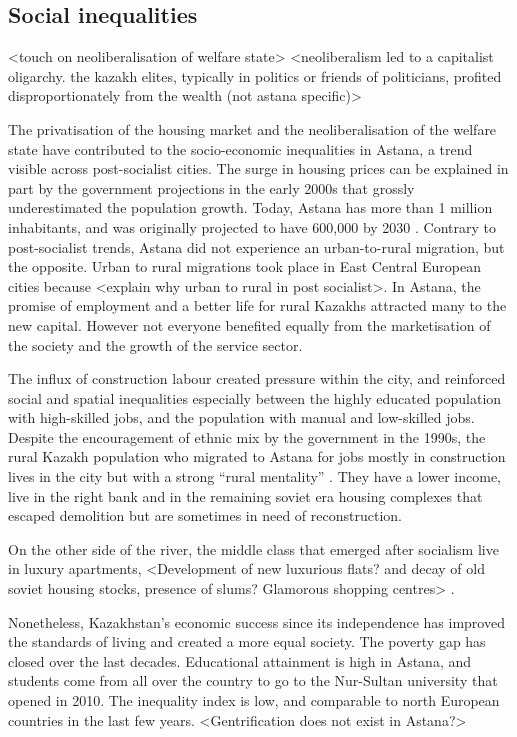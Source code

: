 \documentclass{article}
\begin{document}
\subsection{Social inequalities}

<touch on neoliberalisation of welfare state> 
<neoliberalism led to a capitalist oligarchy. the kazakh elites, typically in politics or friends of politicians, profited disproportionately from the wealth (not astana specific)>

The privatisation of the housing market and the neoliberalisation of the welfare state have contributed to the socio-economic inequalities in Astana, a trend visible across post-socialist cities. The surge in housing prices can be explained in part by the government projections in the early 2000s that grossly underestimated the population growth. Today, Astana has more than 1 million inhabitants, and was originally projected to have 600,000 by 2030 \parencite{masterplan2001}. Contrary to post-socialist trends, Astana did not experience an urban-to-rural migration, but the opposite. Urban to rural migrations took place in East Central European cities because <explain why urban to rural in post socialist>. In Astana, the promise of employment and a better life for rural Kazakhs attracted many to the new capital. However not everyone benefited equally from the marketisation of the society and the growth of the service sector.

The influx of construction labour created pressure within the city, and reinforced social and spatial inequalities especially between the highly educated population with high-skilled jobs, and the population with manual and low-skilled jobs.
Despite the encouragement of ethnic mix by the government in the 1990s, the rural Kazakh population who migrated to Astana for jobs mostly in construction lives in the city but with a strong ``rural mentality'' \parencite{koch2014bordering}. They have a lower income, live in the right bank and in the remaining soviet era housing complexes that escaped demolition but are sometimes in need of reconstruction.

On the other side of the river, the middle class that emerged after socialism live in luxury apartments,  <Development of new luxurious flats? and decay of old soviet housing stocks, presence of slums? Glamorous shopping centres> \parencite{todo}.

Nonetheless, Kazakhstan's economic success since its independence has improved the standards of living and created a more equal society. The poverty gap has closed over the last decades. Educational attainment is high in Astana, and students come from all over the country to go to the Nur-Sultan university that opened in 2010. The inequality index is low, and comparable to north European countries in the last few years. <Gentrification does not exist in Astana?>
\end{document}
